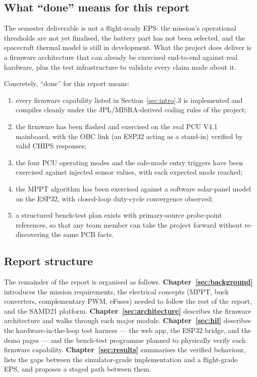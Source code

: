 \subsection{What ``done'' means for this report}

The semester deliverable is not a flight-ready EPS: the mission's
operational thresholds are not yet finalised, the battery part has
not been selected, and the spacecraft thermal model is still in
development. What the project does deliver is a firmware architecture
that can already be exercised end-to-end against real hardware, plus
the test infrastructure to validate every claim made about it.

Concretely, ``done'' for this report means:

\begin{enumerate}
\item every firmware capability listed in
Section~\ref{sec:intro}.3 is implemented and compiles cleanly under
the JPL/MISRA-derived coding rules of the project;
\item the firmware has been flashed and exercised on the real PCU
V4.1 mainboard, with the OBC link (an ESP32 acting as a stand-in)
verified by valid CHIPS responses;
\item the four PCU operating modes and the safe-mode entry triggers
have been exercised against injected sensor values, with each
expected mode reached;
\item the MPPT algorithm has been exercised against a software
solar-panel model on the ESP32, with closed-loop duty-cycle
convergence observed;
\item a structured bench-test plan exists with primary-source
probe-point references, so that any team member can take the project
forward without re-discovering the same PCB facts.
\end{enumerate}

\subsection{Report structure}

The remainder of the report is organised as follows.
\textbf{Chapter~\ref{sec:background}} introduces the mission
requirements, the electrical concepts (MPPT, buck converters,
complementary PWM, eFuses) needed to follow the rest of the report,
and the SAMD21 platform.
\textbf{Chapter~\ref{sec:architecture}} describes the firmware
architecture and walks through each major module.
\textbf{Chapter~\ref{sec:hil}} describes the hardware-in-the-loop test
harness --- the web app, the ESP32 bridge, and the demo pages --- and
the bench-test programme planned to physically verify each firmware
capability.
\textbf{Chapter~\ref{sec:results}} summarises the verified
behaviour, lists the gaps between the simulator-grade
implementation and a flight-grade EPS, and proposes a staged path
between them.
